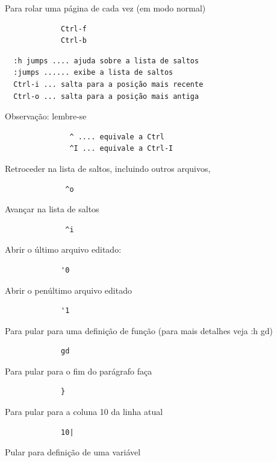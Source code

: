 \documentclass[10pt,a4paper,openany]{book}
\begin{document}
Para rolar uma página de cada vez (em modo normal)

\begin{verbatim}
			 Ctrl-f
			 Ctrl-b
\end{verbatim}


\begin{verbatim}
  :h jumps .... ajuda sobre a lista de saltos
  :jumps ...... exibe a lista de saltos
  Ctrl-i ... salta para a posição mais recente
  Ctrl-o ... salta para a posição mais antiga
\end{verbatim}

Observação: lembre-se

\begin{verbatim}
			   ^ .... equivale a Ctrl
			   ^I ... equivale a Ctrl-I
\end{verbatim}


Retroceder na lista de saltos, incluindo outros arquivos,

\begin{verbatim}
			  ^o
\end{verbatim}

Avançar na lista de saltos

\begin{verbatim}
			  ^i
\end{verbatim}

Abrir o último arquivo editado:

\begin{verbatim}
			 '0
\end{verbatim}

Abrir o penúltimo arquivo editado

\begin{verbatim}
			 '1
\end{verbatim}

Para pular para uma definição de função (para mais detalhes veja :h gd)

\begin{verbatim}
			 gd
\end{verbatim}

Para pular para o fim do parágrafo faça

\begin{verbatim}
			 }
\end{verbatim}

Para pular para a coluna 10 da linha atual

\begin{verbatim}
			 10|
\end{verbatim}

Pular para definição de uma variável
\end{document}
